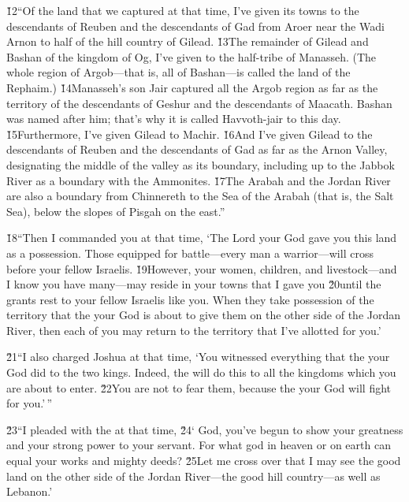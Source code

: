 \v{12}``Of the land that we captured at that time, I've given its towns to the descendants of Reuben and the descendants of Gad from Aroer near the Wadi Arnon to half of the hill country of Gilead. \v{13}The remainder of Gilead and Bashan of the kingdom of Og, I've given to the half-tribe of Manasseh. (The whole region of Argob---that is, all of Bashan---is called the land of the Rephaim.) \v{14}Manasseh's son Jair captured all the Argob region as far as the territory of the descendants of Geshur and the descendants of Maacath. Bashan was named after him; that's why it is called Havvoth-jair to this day. \v{15}Furthermore, I've given Gilead to Machir. \v{16}And I've given Gilead to the descendants of Reuben and the descendants of Gad as far as the Arnon Valley, designating the middle of the valley as its boundary, including up to the Jabbok River as a boundary with the Ammonites. \v{17}The Arabah and the Jordan River are also a boundary from Chinnereth to the Sea of the Arabah (that is, the Salt Sea), below the slopes of Pisgah on the east.''

\v{18}``Then I commanded you at that time, `The Lord your God gave you this land as a possession. Those equipped for battle---every man a warrior---will cross before your fellow Israelis. \v{19}However, your women, children, and livestock---and I know you have many---may reside in your towns that I gave you \v{20}until the  grants rest to your fellow Israelis like you. When they take possession of the territory that the  your God is about to give them on the other side of the Jordan River, then each of you may return to the territory that I've allotted for you.'

\v{21}``I also charged Joshua at that time, `You witnessed everything that the  your God did to the two kings. Indeed, the  will do this to all the kingdoms which you are about to enter. \v{22}You are not to fear them, because the  your God will fight for you.'\,''

\v{23}``I pleaded with the  at that time, \v{24}` God, you've begun to show your greatness and your strong power to your servant. For what god in heaven or on earth can equal your works and mighty deeds? \v{25}Let me cross over that I may see the good land on the other side of the Jordan River---the good hill country---as well as Lebanon.'

